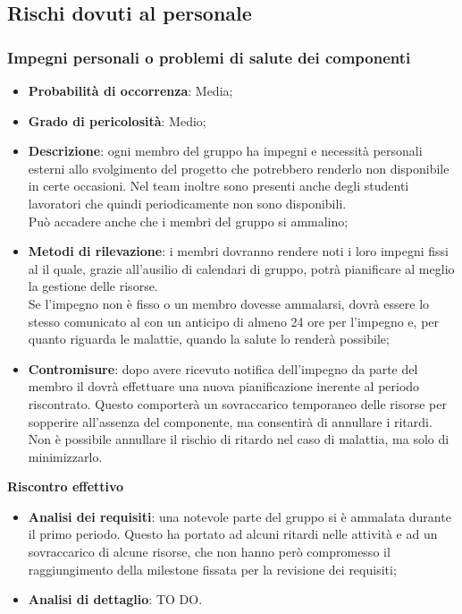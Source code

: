 	
	\subsection{Rischi dovuti al personale} %
	\label{sub:rischi_dovuti_al_personale}
		\subsubsection{Impegni personali o problemi di salute dei componenti} %
		\label{ssub:impegni_personali_dei_componenti}
			\begin{itemize}
				\item \textbf{Probabilità di occorrenza}: Media;
				\item \textbf{Grado di pericolosità}: Medio;
				\item \textbf{Descrizione}: ogni membro del gruppo ha impegni e necessità personali esterni allo svolgimento del progetto che potrebbero renderlo non disponibile in certe occasioni. Nel team inoltre sono presenti anche degli studenti lavoratori che quindi periodicamente non sono disponibili. \\
				Può accadere anche che i membri del gruppo si ammalino;
				\item \textbf{Metodi di rilevazione}: i membri dovranno rendere noti i loro impegni fissi al \roleProjectManager{} il quale, grazie all'ausilio di calendari di gruppo, potrà pianificare al meglio la gestione delle risorse. \\
				Se l'impegno non è fisso o un membro dovesse ammalarsi, dovrà essere lo stesso comunicato al \roleProjectManager{} con un anticipo di almeno 24 ore per l'impegno e, per quanto riguarda le malattie, quando la salute lo renderà possibile;
				\item \textbf{Contromisure}: dopo avere ricevuto notifica dell'impegno da parte del membro il \roleProjectManager{} dovrà effettuare una nuova pianificazione inerente al periodo riscontrato. Questo comporterà un sovraccarico temporaneo delle risorse per sopperire all'assenza del componente, ma consentirà di annullare i ritardi. \newline
				Non è possibile annullare il rischio di ritardo nel caso di malattia, ma solo di minimizzarlo.
			\end{itemize}
		\noindent
		\textbf{Riscontro effettivo}
			\begin{itemize}
				\item \textbf{Analisi dei requisiti}: una notevole parte del gruppo si è ammalata durante il primo periodo. Questo ha portato ad alcuni ritardi nelle attività e ad un sovraccarico di alcune risorse, che non hanno però compromesso il raggiungimento della milestone fissata per la revisione dei requisiti;
				\item \textbf{Analisi di dettaglio}: TO DO.
			\end{itemize}

